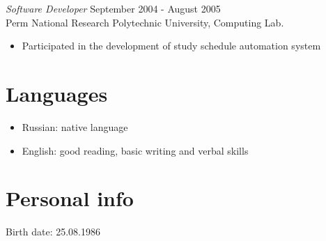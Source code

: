 \documentclass[13pt]{res}
\begin{document}
\begin{resume}
{\sl Software Developer} \hfill September 2004 - August 2005 \\
Perm National Research Polytechnic University, Computing Lab.
\begin{itemize}
\item Participated in the development of study schedule automation system
\end{itemize} 

\section{Languages}
\begin{itemize}
\item Russian: native language
\item English: good reading, basic writing and verbal skills
\end{itemize}

\section{Personal info}
Birth date: 25.08.1986

\end{resume}
\end{document}
